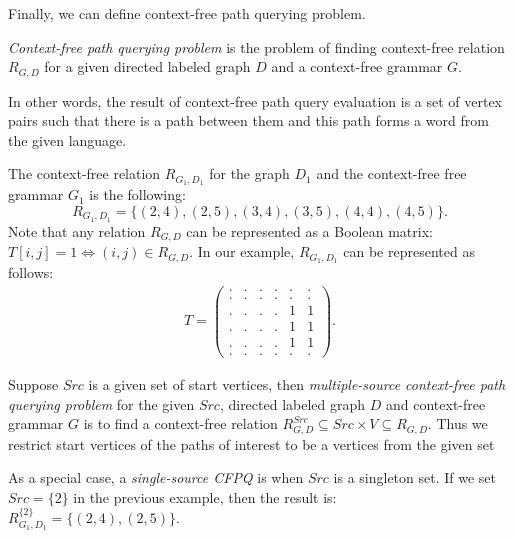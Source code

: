 Finally, we can define context-free path querying problem.
\begin{definition}
    \emph{Context-free path querying problem} is the problem of finding context-free relation $R_{G, D}$ for a given directed labeled graph $D$ and a context-free grammar $G$.
\end{definition}

In other words, the result of context-free path query evaluation is a set of vertex pairs such that there is a path between them and this path forms a word from the given language.

The context-free relation $R_{G_1,D_1}$ for the graph $D_1$ and the context-free free grammar $G_1$ is the following:
$$R_{G_1, D_1} = \{(2, 4), (2, 5), (3, 4), (3, 5), (4, 4), (4, 5)\}.$$
Note that any relation $R_{G, D}$ can be represented as a Boolean matrix: $T[i,j] = 1 \iff (i,j) \in R_{G, D}.$
In our example, $R_{G_1, D_1}$ can be represented as follows:
{
    \renewcommand{\arraystretch}{0.7}
    \setlength\arraycolsep{2pt}
\begin{align*}
T =
\begin{pmatrix}
    . & . & . & . & . & . \\
    . & . & . & . & . & . \\
    . & . & . & . & 1 & 1 \\
    . & . & . & . & 1 & 1 \\
    . & . & . & . & 1 & 1 \\
    . & . & . & . & . & .
\end{pmatrix}.
\end{align*}
}

\begin{definition}
    Suppose $Src$ is a given set of start vertices, then \textit{multiple-source context-free path querying problem} for the given $Src$, directed labeled graph $D$ and context-free grammar $G$ is to find a context-free relation
    $R_{G, D}^{Src} \subseteq Src\times V \subseteq R_{G,D}.$
    Thus we restrict start vertices of the paths of interest to be a vertices from the given set
\end{definition}

As a special case, a \emph{single-source CFPQ} is when $Src$ is a singleton set.
If we set $Src=\{2\}$ in the previous example, then the result is: $R_{G_1, D_1}^{\{2\}} = \{(2, 4), (2, 5)\}.$

